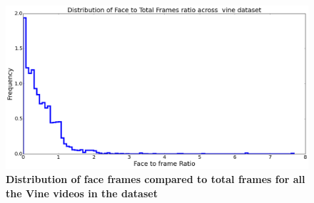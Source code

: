 \begin{figure}
\centering
\includegraphics[width=\columnwidth]{plots/faceratio_destribution_dataset}
\caption{\textbf{ Distribution of face frames compared to total frames for all the Vine videos in the dataset}}
\label{fig:faceratio_destribution}
\end{figure}
